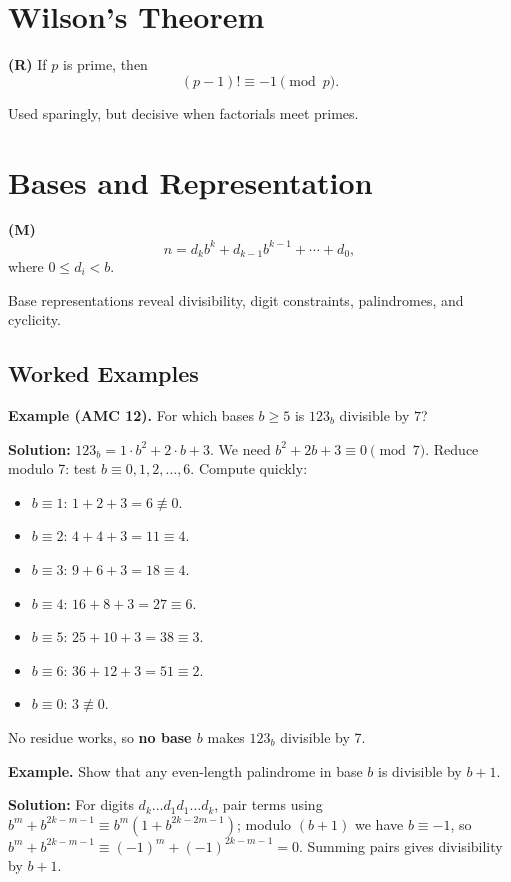 \documentclass[12pt]{extarticle}
\begin{document}
\section{Wilson’s Theorem}

\textbf{(R)} If $p$ is prime, then
\[
(p-1)!\equiv -1 \pmod p.
\]

Used sparingly, but decisive when factorials meet primes.

\section{Bases and Representation}

\textbf{(M)}
\[
n=d_k b^k + d_{k-1} b^{k-1} + \cdots + d_0,
\]
where $0\le d_i<b$.

Base representations reveal divisibility, digit constraints, palindromes, and cyclicity.

\subsection*{Worked Examples}

\begin{examplebox}
	\textbf{Example (AMC 12).} For which bases $b\ge 5$ is $123_b$ divisible by $7$?
\end{examplebox}

	\textbf{Solution:}
$123_b = 1\cdot b^2 + 2\cdot b + 3$. We need $b^2 + 2b + 3 \equiv 0\pmod{7}$.
Reduce modulo 7: test $b \equiv 0,1,2,\dots,6$. Compute quickly:
\begin{itemize}
\item $b\equiv 1$: $1+2+3=6\not\equiv0$.
\item $b\equiv 2$: $4+4+3=11\equiv4$.
\item $b\equiv 3$: $9+6+3=18\equiv4$.
\item $b\equiv 4$: $16+8+3=27\equiv6$.
\item $b\equiv 5$: $25+10+3=38\equiv3$.
\item $b\equiv 6$: $36+12+3=51\equiv2$.
\item $b\equiv 0$: $3\not\equiv0$.
\end{itemize}
No residue works, so \textbf{no base $b$} makes $123_b$ divisible by 7.

\begin{examplebox}
	\textbf{Example.} Show that any even-length palindrome in base $b$ is divisible by $b+1$.
\end{examplebox}

	\textbf{Solution:} For digits $d_k\dots d_1d_1\dots d_k$, pair terms using $b^m+b^{2k-m-1} \equiv b^m(1+b^{2k-2m-1})$; modulo $(b+1)$ we have $b\equiv -1$, so $b^m + b^{2k-m-1} \equiv (-1)^m + (-1)^{2k-m-1} = 0$. Summing pairs gives divisibility by $b+1$.
\end{document}
